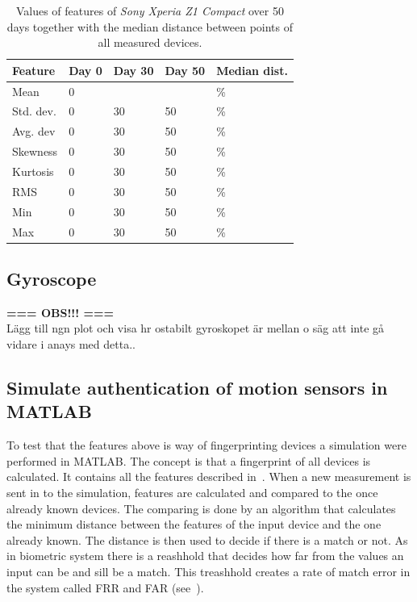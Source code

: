 \begin{table}[H]
\centering
\begin{tabular}{| p{2cm} | p{1cm} | p{1cm} | p{1cm} | p{1cm} |} 
	\hline
  Feature 	& Day 0 & Day 30 & Day 50 & Median dist. 	\\ \hline
  Mean 		& 0 	& 		& 		& \%		\\ \hline
  Std. dev. & 0 	& 30 	& 50 	& \%	\\ \hline
  Avg. dev 	& 0 	& 30 	& 50 	& \%	\\ \hline
  Skewness 	& 0 	& 30 	& 50 	& \%	\\ \hline
  Kurtosis 	& 0 	& 30 	& 50 	& \%	\\ \hline
  RMS 		& 0 	& 30 	& 50 	& \%	\\ \hline
  Min 		& 0 	& 30 	& 50 	& \%	\\ \hline
  Max 		& 0 	& 30 	& 50 	& \%	\\ \hline
\end{tabular} 
\caption[Table caption text]{Values of features of \textit{Sony Xperia Z1 Compact} over 50 days together with the median distance between points of all measured devices.} \label{table:feature50}
\end{table}

\subsection{Gyroscope}
\textbf{=== OBS!!! ===\\}Lägg till ngn plot och visa hr ostabilt gyroskopet är mellan o säg att inte gå vidare i anays med detta..

\subsection{Simulate authentication of motion sensors in MATLAB}
To test that the features above is way of fingerprinting devices a simulation were performed in MATLAB. The concept is that a fingerprint of all devices is calculated. It contains all the features described in~. When a new measurement is sent in to the simulation, features are calculated and compared to the once already known devices. The comparing is done by an algorithm that calculates the minimum distance between the features of the input device and the one already known. The distance is then used to decide if there is a match or not. As in biometric system there is a reashhold that decides how far from the values an input can be and sill be a match. This treashhold creates a rate of match error in the system called FRR and FAR (see~). 

